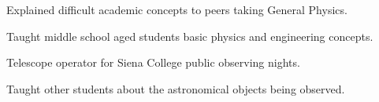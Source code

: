 \documentclass[a4paper, 12pt]{article}
\begin{document}
\vspace*{5pt}
\begin{zitemize}
\item Explained difficult academic concepts to peers taking General Physics.
\end{zitemize}

\vspace*{5pt}
\begin{zitemize}
    \item Taught middle school aged students basic physics and engineering concepts.
\end{zitemize}

\vspace*{5pt}
\begin{zitemize}
    \item Telescope operator for Siena College public observing nights.
    \item Taught other students about the astronomical objects being observed. 
\end{zitemize}
\vspace*{5pt}
\end{document}
